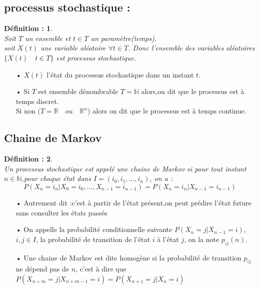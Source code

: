 \documentclass[a4paper,12pt]{report}
\newtheorem*{definition}{Définition :}
\begin{document}
\subsection{processus stochastique :}
\begin{definition}\ \\
Soit $T$ un ensemble et $t\in T $ un paramètre(temps).\\
soit $X(t)$ une variable aléatoire $\forall t \in T$. Donc l'ensemble des variables aléatoires  $\{X(t)\quad t \in T\}$ est processus stochastique.
\end{definition}
\begin{itemize}
\item[•]$X(t)$ l'état du processus stochastique dans un instant $t$.
\item[•] Si $T$ est ensemble dénombrable \( T=\mathbb{N} \)  alors,on dit que le processus est à temps discret.\\Si non \((T=\mathbb{R}\quad ou\quad\mathbb{R}^n\)) alors on dit que le processus est à temps continue.
\end{itemize}
\subsection{Chaine de Markov}
\begin{definition}\ \\
Un processus stochastique est appelé une chaine de Markov si pour tout instant $n \in \mathbb{N}$,pour chaque état dans $I=(i_0,i_1,...,i_n)$, on a :
\[ P(X_n=i_n|X_0=i_0,...,X_{n-1}=i_{n-1})=P(X_n=i_n|X_{n-1}=i_{n-1})\]
\end{definition}
\begin{itemize}
\item[•]Autrement dit :c'est à partir de l'état présent,on peut prédire l'état future sans consulter les états passés 
\item[•]On appelle la probabilité conditionnelle suivante $P(X_n=j|X_{n-1}=i)$, $i,j \in I$, la probabilité de transition de l'état $i$ à l'état $j$, on la note $p_{ij}(n)$.
\item[•]Une chaine de Markov est dite homogène si la probabilité de transition $p_{ij}$ ne dépend pas de $n$, c'est à dire que $P(X_{n+m}=j|X_{n+m-1}=i)=P(X_{n+1}=j|X_{n}=i)$
\end{itemize}
\end{document}
